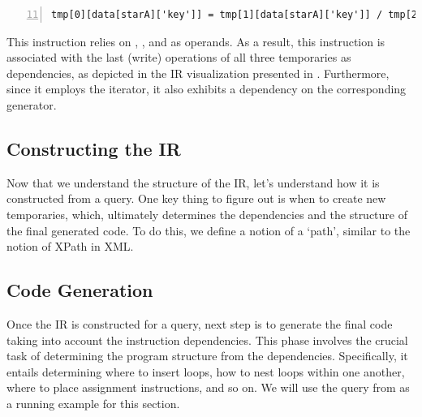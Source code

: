 \documentclass[runningheads]{llncs}
\begin{document}
\begin{lstlisting}[style=JavaScript, columns=flexible, numbers=left, firstnumber=11]
tmp[0][data[starA]['key']] = tmp[1][data[starA]['key']] / tmp[2]
\end{lstlisting}

This instruction relies on , , and  as operands.
As a result, this instruction is associated with the last (write) operations of all three
temporaries as dependencies, as depicted in the IR visualization presented in .
Furthermore, since it employs the  iterator, it also exhibits a dependency on the
corresponding generator.


\subsection{Constructing the IR}
Now that we understand the structure of the IR, let's understand how it is constructed
from a query.
One key thing to figure out is when to create new temporaries, which, ultimately
determines the dependencies and the structure of the final generated code.
To do this, we define a notion of a `path', similar to the notion of XPath in XML.





\subsection{Code Generation}
Once the IR is constructed for a query, next step is to generate the final code
taking into account the instruction dependencies.
This phase involves the crucial task of determining the program structure from
the dependencies.
Specifically, it entails determining where to insert loops, how to nest loops
within one another, where to place assignment instructions, and so on. 
We will use the query from  as a running example for this
section.
\end{document}
